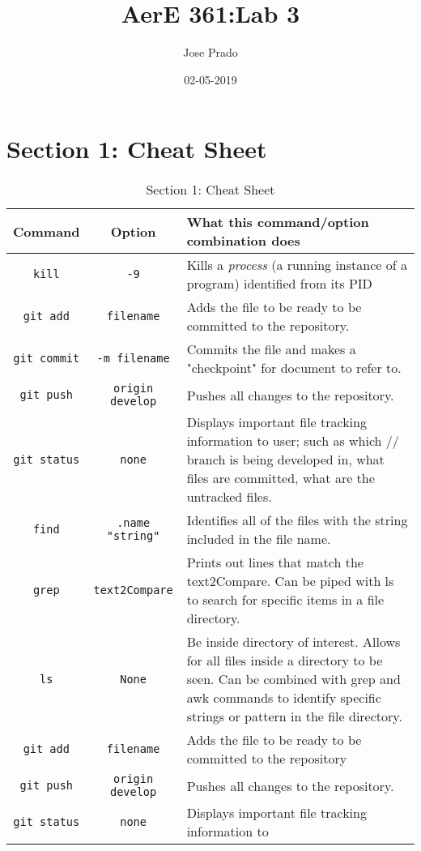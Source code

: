 \documentclass[9pt]{article}
\title{AerE 361:Lab 3}
\date{02-05-2019}
\author{Jose Prado}
\begin{document}
\maketitle
\newpage

\section{Section 1: Cheat Sheet}

\begin{sidewaystable}
\caption{Section 1: Cheat Sheet}
\begin{tabular}{|c|c|p{4.5in}|}
\hline
Command & Option & What this command/option combination does \\
\hline

\hline
 \texttt{kill} & \texttt{-9} & Kills a \emph{process} (a running instance
 of a program) identified from its PID \\
\hline
 \texttt{git add} & \texttt{filename} & Adds the file to be ready to be committed to the repository.\\
 \texttt{git commit} & \texttt{-m filename} & Commits the file and makes a "checkpoint" for document to refer to.\\
\hline
 \texttt{git push} & \texttt{origin develop} & Pushes all changes to the repository.\\
\hline
 \texttt{git status} & \texttt{none} & Displays important file tracking information to
 user; such as which //
 branch is being developed in, what files are committed, what
 are the untracked files.\\
\hline
 \texttt{find} & \texttt{.name "string"} & Identifies all of the files with the string
 included in the file name.\\
\hline
 \texttt{grep} & \texttt{text2Compare} & Prints out lines that match the text2Compare. Can
 be piped with ls to search for specific items in a file directory.\\
\hline
 \texttt{ls} & \texttt{None} & Be inside directory of interest. Allows for all files
 inside a directory to be seen. Can be combined with grep and awk commands to identify
 specific strings or pattern in the file directory.\\
\hline
 \texttt{git add} & \texttt{filename} & Adds the file to be ready to be committed to the repository\\
\hline
 \texttt{git push} & \texttt{origin develop} & Pushes all changes to the repository.\\
\hline
 \texttt{git status} & \texttt{none} & Displays important file tracking information to

\end{tabular}
\end{sidewaystable}
\end{document}
